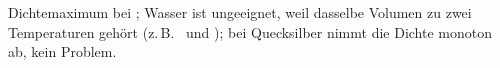 Dichtemaximum bei \tdMO; Wasser ist ungeeignet, weil dasselbe Volumen zu zwei Temperaturen gehört (z.\,B. \tdAO\ und \tdBO); bei Quecksilber nimmt die Dichte monoton ab, kein Problem.

